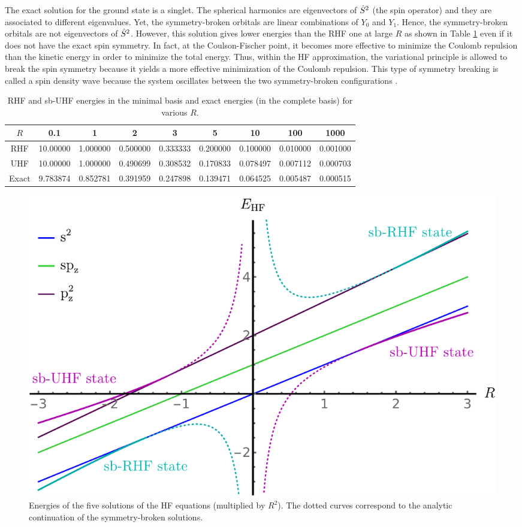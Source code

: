 \documentclass[11pt,a4paper]{article}
\newcommand{\hS}{\Hat{S}}
\begin{document}
The exact solution for the ground state is a singlet. The spherical harmonics are eigenvectors of $\hS^2$ (the spin operator) and they are associated to different eigenvalues. Yet, the symmetry-broken orbitals are linear combinations of $Y_0$ and $Y_1$. Hence, the symmetry-broken orbitals are not eigenvectors of $\hS^2$. However, this solution gives lower energies than the RHF one at large $R$ as shown in Table \ref{tab:ERHFvsEUHF} even if it does not have the exact spin symmetry. In fact, at the Coulson-Fischer point, it becomes more effective to minimize the Coulomb repulsion than the kinetic energy in order to minimize the total energy. Thus, within the HF approximation, the variational principle is allowed to break the spin symmetry because it yields a more effective minimization of the Coulomb repulsion. This type of symmetry breaking is called a spin density wave because the system oscillates between the two symmetry-broken configurations \cite{GiulianiBook}.

\begin{table}
\centering
\caption{RHF and sb-UHF energies in the minimal basis and exact energies (in the complete basis) for various $R$.}
\begin{tabular}{ccccccccc}
\hline
\hline
$R$ & 0.1 & 1 & 2 & 3 & 5 & 10 & 100 & 1000 \\
\hline
RHF 	& 10.00000 & 1.000000 & 0.500000 & 0.333333 & 0.200000 & 0.100000 & 0.010000 & 0.001000 \\
UHF 	& 10.00000 & 1.000000 & 0.490699 & 0.308532 & 0.170833 & 0.078497 & 0.007112 & 0.000703 \\
Exact 	& 9.783874 & 0.852781 & 0.391959 & 0.247898 & 0.139471 & 0.064525 & 0.005487 & 0.000515 \\
\hline
\hline
\end{tabular}
\label{tab:ERHFvsEUHF}
\end{table}


\begin{figure}
    \centering
    \includegraphics[width=0.5\linewidth]{EsbHF.pdf}
    \caption{Energies of the five solutions of the HF equations (multiplied by $R^2$). The dotted curves correspond to the analytic continuation of the symmetry-broken solutions.}
    \label{fig:SpheriumNrj}
\end{figure}
\end{document}
